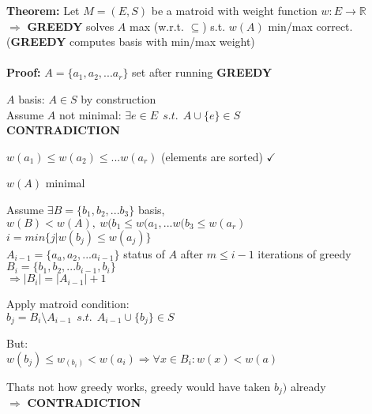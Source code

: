 \textbf{Theorem: } Let $M=(E, S)$ be a matroid with weight function $w:E\rightarrow \mathbb{R}$\\
$\Rightarrow$ \textbf{GREEDY} solves $A$ max (w.r.t. $\subseteq$) s.t. $w(A)$ min/max correct. (\textbf{GREEDY} computes basis with min/max weight)\\\\
\textbf{Proof: } $A=\{a_1, a_2, ... a_r\}$ set after running \textbf{GREEDY}
\begin{compactenum}
	\item{
		\begin{compactenum}[(a)]
			\item{$A$ basis: $A\in S$ by construction\\
			Assume $A$ not minimal: $\exists e \in E~~s.t.~~A\cup\{e\}\in S$\\ \textbf{CONTRADICTION}
			}
			\item{$w(a_1)\le w(a_2) \le ... w(a_r)$ (elements are sorted) $\checkmark$}
			\item{$w(A)$ minimal}
		\end{compactenum}
	\item{Assume $\exists B = \{b_1, b_2, ... b_3\}$ basis, $w(B) < w(A),~ w(b_1\le w(a_1, ... w(b_3\le w(a_r)$\\
	$i=min\{j | w(b_j)\le w(a_j)\}$}\\
	$A_{i-1}=\{a_a, a_2, ... a_{i-1}\}$ status of $A$ after $m\le i-1$ iterations of greedy\\
	$B_i = \{b_1, b_2, ... b_{i-1}, b_i\}$\\
	$\Rightarrow |B_i| = |A_{i-1}|+1$
	}
	\item{Apply matroid condition:\\
	$b_j = B_i \setminus A_{i-1}~~s.t.~~A_{i-1}\cup \{b_j\}\in S$}
	\item{But:\\
	$w(b_j)\le w_(b_i) < w(a_i) \Rightarrow \forall x \in B_i : w(x) < w(a)$}
	\item{Thats not how greedy works, greedy would have taken $b_j)$ already\\
	$\Rightarrow$ \textbf{CONTRADICTION}}
\end{compactenum}

